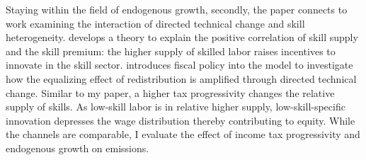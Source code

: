 


Staying within the field of endogenous growth, secondly, the paper connects to work examining the interaction of directed technical change and skill heterogeneity. \cite{Acemoglu2002DirectedChange} develops a theory to explain the positive correlation of skill supply and the skill premium: the higher supply of skilled labor raises incentives to innovate in the skill sector. \cite{Loebbing2019NationalChange} introduces fiscal policy into the model to investigate how the equalizing effect of redistribution is amplified through directed technical change. Similar to my paper, a higher tax progressivity changes the relative supply of skills. As low-skill labor is in relative higher supply, low-skill-specific innovation depresses the wage distribution thereby contributing to equity. While the channels are comparable, I evaluate the effect of income tax progressivity and endogenous growth on emissions. 


